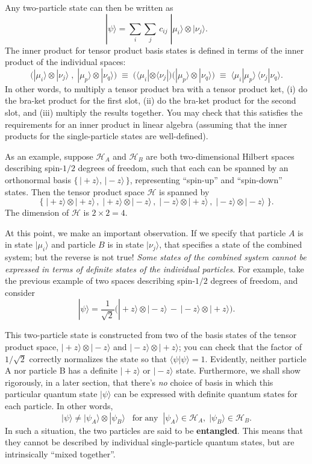 \documentclass[pra,11pt]{revtex4}
\begin{document}
Any two-particle state can then be written as
$$|\psi\rangle = \sum_{i} \sum_{j} \, c_{ij}\; |\mu_i\rangle \otimes |\nu_j\rangle.$$
The inner product for tensor product basis states is defined in terms
of the inner product of the individual spaces:
$$\Big(|\mu_i\rangle \otimes |\nu_j\rangle\;,\; |\mu_p\rangle \otimes |\nu_q\rangle \Big) \;\equiv\; \big(\langle\mu_i| \otimes \langle\nu_j| \big) \big(|\mu_p\rangle \otimes |\nu_q\rangle\big) \;\equiv\; \langle\mu_i|\mu_p\rangle \, \langle\nu_j|\nu_q\rangle.$$
In other words, to multiply a tensor product bra with a tensor product
ket, (i) do the bra-ket product for the first slot, (ii) do the
bra-ket product for the second slot, and (iii) multiply the results
together.  You may check that this satisfies the requirements for an
inner product in linear algebra (assuming that the inner products for
the single-particle states are well-defined).

As an example, suppose $\mathscr{H}_A$ and $\mathscr{H}_B$ are both
two-dimensional Hilbert spaces describing spin-$1/2$ degrees
of freedom, such that each can be spanned by an orthonormal basis
$\{\,|\!+\!z\rangle, \,|\!-\!z\rangle \, \}$, representing ``spin-up''
and ``spin-down'' states.  Then the tensor product space $\mathscr{H}$
is spanned by
$$\Big\{\;|\!+\!z\rangle\otimes|\!+\!z\rangle\,,\; |\!+\!z\rangle\otimes|\!-\!z\rangle\,,\; |\!-z\!\rangle\otimes|\!+\!z\rangle\,,\; |\!-\!z\rangle\otimes|\!-\!z\rangle \;\Big\}.$$
The dimension of $\mathscr{H}$ is $2 \times 2 = 4$.  

At this point, we make an important observation.  If we specify that
particle $A$ is in state $|\mu_i\rangle$ and particle $B$ is in state
$|\nu_j\rangle$, that specifies a state of the combined system; but
the reverse is not true!  \textit{Some states of the combined system
  cannot be expressed in terms of definite states of the individual
  particles.}  For example, take the previous example of two spaces
describing spin-$1/2$ degrees of freedom, and consider
$$|\psi\rangle = \frac{1}{\sqrt{2}} \Big(|\!+\!z\rangle\otimes|\!-\!z\rangle \,-\, |\!-z\!\rangle\otimes|\!+\!z\rangle\Big).$$

This two-particle state is constructed from two of the basis states of
the tensor product space,
$|\!+\!z\rangle\otimes|\!-\!z\rangle$ and
$|\!-\!z\rangle\otimes|\!+\!z\rangle$; you can check that
the factor of $1/\sqrt{2}$ correctly normalizes the state so that
$\langle\psi|\psi\rangle = 1$.  Evidently, neither particle A nor
particle B has a definite $|\!+\!z\rangle$ or
$|\!-\!z\rangle$ state.  Furthermore, we shall show rigorously,
in a later section, that there's \textit{no} choice of basis in which this
particular quantum state $|\psi\rangle$ can be expressed with
definite quantum states for each particle.  In other words,
$$|\psi\rangle \ne |\psi_A\rangle\otimes|\psi_B\rangle \;\;\;\textrm{for}\;\textrm{any}\;\; |\psi_A\rangle \in \mathscr{H}_A, \;|\psi_B\rangle \in \mathscr{H}_B.$$
In such a situation, the two particles are said to be
\textbf{entangled}.  This means that they cannot be described by
individual single-particle quantum states, but are intrinsically
``mixed together''.
\end{document}
